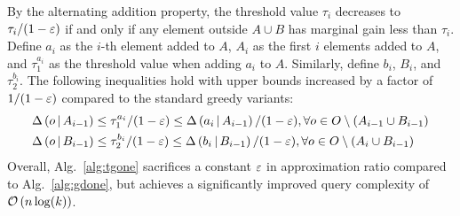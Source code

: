 By the alternating addition property,
the threshold value $\tau_i$ decreases to $\tau_i/(1-\varepsilon)$
if and only if any element outside $A\cup B$ has marginal gain
less than $\tau_i$.
Define $a_i$ as the $i$-th element added to $A$,
$A_i$ as the first $i$ elements added to $A$,
and $\tau_1^{a_i}$ as the threshold value when adding $a_i$ to $A$.
Similarly, define $b_i$, $B_i$, and $\tau_2^{b_i}$.
The following inequalities hold with upper bounds increased by a factor of
$1/(1-\varepsilon)$ compared to the standard greedy variants:
\begin{align*}
    &\Delta \left( o \, \middle| \, A_{i-1} \right) \le \tau_1^{a_i} /(1-\varepsilon) \le \Delta \left( a_i \, \middle| \, A_{i-1} \right)/(1-\varepsilon), \forall o\in O\setminus (A_{i-1} \cup B_{i-1}) \\
    &\Delta \left( o \, \middle| \, B_{i-1} \right) \le \tau_2^{b_i} /(1-\varepsilon) \le \Delta \left( b_i \, \middle| \, B_{i-1} \right)/(1-\varepsilon),\forall o\in O\setminus (A_{i} \cup B_{i-1})
\end{align*}
%
%
%
%
Overall, Alg.~\ref{alg:tgone} sacrifices a constant $\varepsilon$ in approximation ratio
compared to Alg.~\ref{alg:gdone},
but achieves a significantly improved query complexity of $\mathcal O \left( n\log (k) \right)$.

